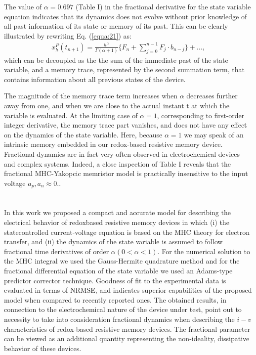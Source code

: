 \documentclass[10pt]{article}
\begin{document}
\begin{multicols}{2}
        The value of $\alpha = 0.697$ (Table I) in the fractional derivative for the state variable equation indicates that its dynamics does not evolve without prior knowledge of all past information of its state or memory of its past. This can be clearly illustrated by rewriting Eq. (\ref{equa:21}) as:
        \begin{align}
            x_h^P (t_{n+1}) = \frac{h^\alpha}{\Gamma (\alpha + 1)} \biggl\{ F_n + \sum_{j=0}^{n-1} F_j \cdot b_{n-j} \biggr\} + ..., \label{equa:28}
        \end{align}
        which can be decoupled as the the sum of the immediate past of the state variable, and a memory trace, represented by the second summation term, that contains information about all previous states of the device. \par
        The magnitude of the memory trace term increases when $\alpha$ decreases further away from one, and when we are close to the actual instant t at which the variable is evaluated. At the limiting case of $\alpha = 1$, corresponding to first-order integer derivative, the memory trace part vanishes, and does not have any effect on the dynamics of the state variable. Here, because $\alpha = 1$ we may speak of an intrinsic memory embedded in our redox-based resistive memory device. Fractional dynamics are in fact very often observed in electrochemical devices and complex systems. Indeed, a close inspection of Table I reveals that the fractional MHC-Yakopcic memristor model is practically insensitive to the input voltage $a_p, a_n \approx 0.$.
        \par
        {\centering %
        \section{ }
        }
        In this work we proposed a compact and accurate model for describing the electrical behavior of redoxbased resistive memory devices in which (i) the statecontrolled current-voltage equation is based on the MHC theory for electron transfer, and (ii) the dynamics of the state variable is assumed to follow fractional time derivatives of order $\alpha (0 < \alpha < 1).$
        For the numerical solution to the MHC integral we used the Gauss-Hermite quadrature method and for the fractional differential equation of the state variable we used an Adams-type predictor corrector technique. Goodness of fit to the experimental data is evaluated in terms of NRMSE, and indicates superior capabilities of the proposed model when compared to recently reported ones. The obtained results, in connection to the electrochemical nature of the device under test, point out to necessity to take into consideration fractional dynamics when describing the $i-v$ characteristics of redox-based resistive memory devices. The fractional parameter can be viewed as an additional quantity representing the non-ideality, dissipative behavior of these devices.
    \end{multicols}
\end{document}

